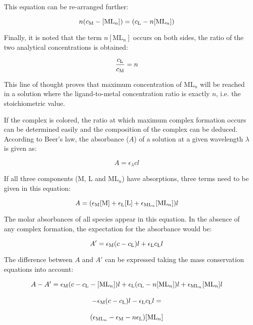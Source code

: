 This equation can be re-arranged further:

\begin{equation}
n(c_{\text M} - [\text {ML}_n] ) = (c_{\text L} - n[\text {ML}_n]) 
\end{equation}

Finally, it is noted that the term $n[\text {ML}_n]$ occurs on both sides, the ratio of the two analytical concentrations is obtained:

\begin{equation}
\frac{c_{\text L}}{c_{\text M}}= n 
\end{equation}

This line of thought proves that maximum concentration of {ML}$_n$ will be reached in a solution where the ligand-to-metal concentration ratio is exactly $n$, i.e. the stoichiometric value.

If the complex is colored, the ratio at which maximum complex formation occurs can be determined easily and the composition of the complex can be deduced. According to Beer's law, the absorbance ($A$) of a solution at a given wavelength $\lambda$ is given as:

\begin{equation}
A = \epsilon_{\lambda} c l 
\end{equation}

If all three components (M, L and ML$_n$) have absorptions, three terms need to be given in this equation:

\begin{equation}
A = (\epsilon_{\text M} [\text M] +\epsilon_{\text L} [\text L] + \epsilon_{\text {ML}_n} [\text {ML}_n])l 
\end{equation}

The molar absorbances of all species appear in this equation. In the absence of any complex formation, the expectation for the absorbance would be:

\begin{equation}
A' = \epsilon_{\text M} (c - c_{\text L}) l +\epsilon_{\text L} c_{\text L} l 
\end{equation}
 
The difference between $A$ and $A'$ can be expressed taking the mass conservation equations into account:

\begin{equation}
\begin{array}{cccc}
A - A' = \epsilon_{\text M} (c - c_{\text L} - [\text {ML}_n]) l + \epsilon_{\text L} (c_{\text L} - n[\text {ML}_n]) l + \epsilon_{\text {ML}_n} [\text {ML}_n] l
\\{}\\
 - \epsilon_{\text M} (c - c_{\text L}) l - \epsilon_{\text L} c_{\text L} l =
\\{}\\
(\epsilon_{\text {ML}_n} - \epsilon_{\text M} - n \epsilon_{\text L}) [\text {ML}_n] 
\end{array}
\end{equation}

